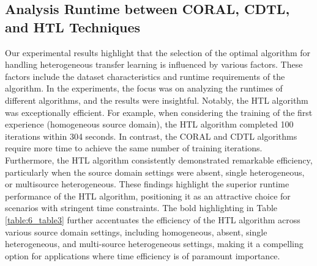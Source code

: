\subsection{Analysis Runtime between CORAL, CDTL, and HTL Techniques}
Our experimental results highlight that the selection of the optimal algorithm for handling heterogeneous transfer learning is influenced by various factors. These factors include the dataset characteristics and runtime requirements of the algorithm. In the experiments, the focus was on analyzing the runtimes of different algorithms, and the results were insightful. Notably, the HTL algorithm was exceptionally efficient. For example, when considering the training of the first experience (homogeneous source domain), the HTL algorithm completed 100 iterations within 304 seconds. In contrast, the CORAL and CDTL algorithms require more time to achieve the same number of training iterations. Furthermore, the HTL algorithm consistently demonstrated remarkable efficiency, particularly when the source domain settings were absent, single heterogeneous, or multisource heterogeneous. These findings highlight the superior runtime performance of the HTL algorithm, positioning it as an attractive choice for scenarios with stringent time constraints. The bold highlighting in Table \ref{table:6_table3} further accentuates the efficiency of the HTL algorithm across various source domain settings, including homogeneous, absent, single heterogeneous, and multi-source heterogeneous settings, making it a compelling option for applications where time efficiency is of paramount importance.
\begin{table}[H]
  \centering
  \caption{Runtimes (in seconds) for CORAL, CDTL, and HTL.}
  \label{table:6_table3}
  \end{table}
  
